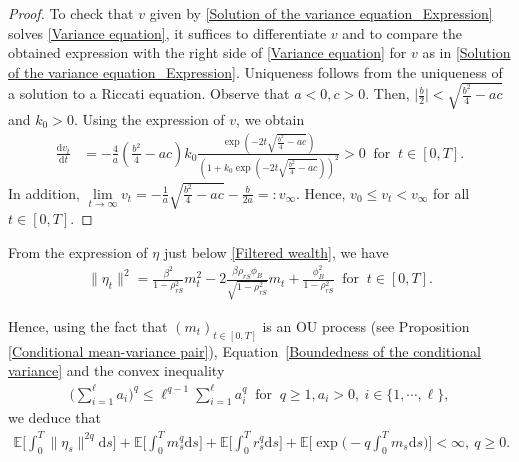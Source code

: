 \documentclass[12,reqno]{amsart}
\numberwithin{equation}{section}
\begin{document}
\begin{proof}
	To check that $v$ given by \eqref{Solution of the variance equation_Expression} solves \eqref{Variance equation}, it suffices to differentiate $v$ and to compare the obtained expression with the right side of \eqref{Variance equation} for $v$ as in \eqref{Solution of the variance equation_Expression}. Uniqueness follows from the uniqueness of a solution to a Riccati equation. Observe that $a<0,c>0$. Then, $\big|\frac{b}{2}\big|<\sqrt{\frac{b^{2}}{4}-ac}$ and $k_{0}>0$. Using the expression of $v$, we obtain
	\begin{align}\label{Sign of the derivative of the condition variance}
		\frac{\mathrm{d}v_{t}}{\mathrm{d}t}&=-\frac{4}{a}\left(\frac{b^{2}}{4}-ac\right)k_{0}\frac{\exp\left(-2t\sqrt{\frac{b^{2}}{4}-ac}\right)}{\left(1+k_{0}\exp\left(-2t\sqrt{\frac{b^{2}}{4}-ac}\right)\right)^{2}}>0~\text{ for }~t\in[0,T].
	\end{align}
	In addition, $\lim\limits_{t\to\infty}v_{t}=-\frac{1}{a}\sqrt{\frac{b^{2}}{4}-ac}-\frac{b}{2a}=:v_{\infty}$. Hence, $v_{0}\le v_{t}<v_{\infty}$ for all $t\in[0,T]$.
\end{proof}

From the expression of $\eta$ just below \eqref{Filtered wealth}, we have
\begin{align}\label{Expression of eta^2}
	\|\eta_{t}\|^{2}=\frac{\beta^{2}}{1-\rho_{rS}^{2}}m_{t}^{2}-2\frac{\beta\rho_{rS}\phi_{B}}{\sqrt{1-\rho_{rS}^{2}}}m_{t}+\frac{\phi_{B}^{2}}{1-\rho_{rS}^{2}}~\text{ for }~t\in[0,T].
\end{align}

Hence, using the fact that $(m_{t})_{t\in[0,T]}$ is an OU process (see Proposition \ref{Conditional mean-variance pair}), Equation~\eqref{Boundedness of the conditional variance} and the convex inequality
\begin{align}\label{Convex inequality}
	\big(\sum_{i=1}^{\ell}a_{i}\big)^{q}\le\ell^{q-1}\sum_{i=1}^{\ell}a_{i}^{q}~\text{ for }~q\ge1,a_{i}>0,~i\in\{1,\cdots,\ell\}, 
\end{align}
we deduce that
\begin{align}\label{Integrability of eta and m_power}
	\mathbb{E}\Big[\int_{0}^{T}\|\eta_{s}\|^{2q}\mathrm{d}s\Big]+\mathbb{E}\Big[\int_{0}^{T}m_{s}^{q}\mathrm{d}s\Big]+\mathbb{E}\Big[\int_{0}^{T}r_{s}^{q}\mathrm{d}s\Big]+\mathbb{E}\Big[\exp\Big(-q\int_{0}^{T}m_{s}\mathrm{d}s\Big)\Big]<\infty,~q\ge0.
\end{align}
\end{document}
